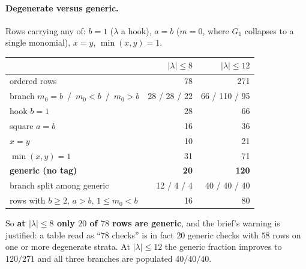 \documentclass[11pt]{article}
\theoremstyle{definition}
\newcommand{\lam}{\lambda}
\begin{document}
\paragraph{Degenerate versus generic.} Rows carrying any of: $b=1$ ($\lam$ a hook), $a=b$
($m=0$, where $G_1$ collapses to a single monomial), $x=y$, $\min(x,y)=1$.
\begin{center}
\begin{tabular}{lrr}
\toprule
 & $|\lam|\le8$ & $|\lam|\le12$\\ \midrule
ordered rows & 78 & 271\\
branch $m_0=b$ \,/\, $m_0<b$ \,/\, $m_0>b$ & 28 / 28 / 22 & 66 / 110 / 95\\
hook $b=1$ & 28 & 66\\
square $a=b$ & 16 & 36\\
$x=y$ & 10 & 21\\
$\min(x,y)=1$ & 31 & 71\\
\textbf{generic (no tag)} & \textbf{20} & \textbf{120}\\
branch split among generic & 12 / 4 / 4 & 40 / 40 / 40\\
rows with $b\ge2$, $a>b$, $1\le m_0<b$ & 16 & 80\\
\bottomrule
\end{tabular}
\end{center}
So \textbf{at $|\lam|\le8$ only $20$ of $78$ rows are generic}, and the brief's warning is
justified: a table read as ``$78$ checks'' is in fact $20$ generic checks with $58$ rows on one or
more degenerate strata. At $|\lam|\le12$ the generic fraction improves to $120/271$ and all three
branches are populated $40/40/40$.
\end{document}
